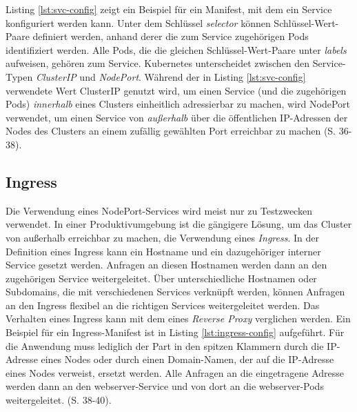 \documentclass[11pt,a4paper]{article}
\begin{document}
Listing \ref{lst:svc-config} zeigt ein Beispiel für ein Manifest,
mit dem ein Service konfiguriert werden kann.
Unter dem Schlüssel \emph{selector} können Schlüssel-Wert-Paare definiert werden,
anhand derer die zum Service zugehörigen Pods identifiziert werden. Alle Pods, die
die gleichen Schlüssel-Wert-Paare unter \emph{labels} aufweisen, gehören zum Service.
Kubernetes unterscheidet zwischen den Service-Typen \emph{ClusterIP} und \emph{NodePort}.
Während der in Listing \ref{lst:svc-config} verwendete Wert ClusterIP genutzt wird, um einen Service
(und die zugehörigen Pods) \emph{innerhalb} eines Clusters
einheitlich adressierbar zu machen, wird NodePort verwendet, um einen Service von \emph{außerhalb}
über die öffentlichen IP-Adressen der Nodes des Clusters an einem zufällig gewählten Port erreichbar zu machen \cite{Schmeling_Dargatz_2022} (S. 36-38).
% 

\subsection{Ingress}
\label{sec:Ingress}
Die Verwendung eines NodePort-Services wird meist nur zu Testzwecken verwendet. In einer Produktivumgebung
ist die gängigere Lösung, um das Cluster von außerhalb erreichbar zu machen, die Verwendung eines \emph{Ingress}.
In der Definition eines Ingress kann ein Hostname und ein dazugehöriger interner Service gesetzt werden.
Anfragen an diesen Hostnamen werden dann an den zugehörigen Service weitergeleitet. Über unterschiedliche Hostnamen
oder Subdomains, die mit verschiedenen Services verknüpft werden, können Anfragen an den Ingress flexibel
an die richtigen Services weitergeleitet werden. Das Verhalten eines Ingress kann mit dem eines \emph{Reverse Proxy} \cite{nginx}
verglichen werden.
Ein Beispiel für ein Ingress-Manifest ist in Listing \ref{lst:ingress-config} aufgeführt.
Für die Anwendung muss lediglich der Part in den spitzen Klammern durch die IP-Adresse eines Nodes
oder durch einen Domain-Namen, der auf die IP-Adresse eines Nodes verweist, ersetzt werden.
Alle Anfragen an die eingetragene Adresse werden dann an den webserver-Service
und von dort an die webserver-Pods weitergeleitet. \cite{Schmeling_Dargatz_2022} (S. 38-40).
% 
\end{document}
